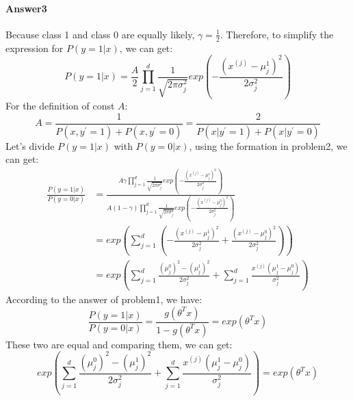 \documentclass[paper=a4, fontsize=11pt]{scrartcl} %
\numberwithin{equation}{section} %
\numberwithin{figure}{section} %
\numberwithin{table}{section} %
\begin{document}
\paragraph{\textbf{Answer3}}
Because class 1 and class 0 are equally likely, $\gamma=\frac{1}{2}$. Therefore, to simplify the expression for $P\left ( y=1|x \right )$, we can get:
\begin{equation*}
P\left ( y=1|x \right )=\frac{A}{2}\prod_{j=1}^{d}\frac{1}{\sqrt{2\pi \sigma _{j}^{2}}}exp\left ( -\frac{\left ( x^{\left ( j \right )}-\mu _{j}^{1} \right )^{2}}{2\sigma _{j}^{2}} \right )
\end{equation*}
For the definition of const $A$:
\begin{equation*}
A =\frac{1}{P\left ( x,y^{'}=1 \right ) +P\left ( x,y^{'}=0 \right )}=\frac{2}{P\left ( x|y^{'}=1 \right ) +P\left ( x|y^{'}=0 \right )}
\end{equation*}
Let's divide $P\left ( y=1|x \right )$ with $P\left ( y=0|x \right )$, using the formation in problem2, we can get:
\begin{align*}
\frac{P\left ( y=1|x \right )}{P\left ( y=0|x \right )}
&= \frac{A \gamma\prod_{j=1}^{d}\frac{1}{\sqrt{2\pi \sigma _{j}^{2}}}exp\left ( -\frac{\left ( x^{\left ( j \right )}-\mu _{j}^{1} \right )^{2}}{2\sigma _{j}^{2}} \right )}{A \left ( 1-\gamma \right )\prod_{j=1}^{d}\frac{1}{\sqrt{2\pi \sigma _{j}^{2}}}exp\left ( -\frac{\left ( x^{\left ( j \right )}-\mu _{j}^{0} \right )^{2}}{2\sigma _{j}^{2}} \right )}
\\&= exp\left ( \sum_{j=1}^{d} \left (  -\frac{\left ( x^{\left ( j \right )}-\mu _{j}^{1} \right )^{2}}{2\sigma _{j}^{2}} +\frac{\left ( x^{\left ( j \right )}-\mu _{j}^{0} \right )^{2}}{2\sigma _{j}^{2}} \right )\right )
\\&= exp\left ( \sum_{j=1}^{d}\frac{\left ( \mu _{j}^{0} \right )^{2}-\left ( \mu _{j}^{1} \right )^{2}}{2\sigma _{j}^{2}}+\sum_{j=1}^{d}\frac{x^{\left ( j \right )}\left ( \mu _{j}^{1}-\mu_{j}^{0} \right )}{\sigma _{j}^{2}} \right )
\end{align*}
According to the answer of problem1, we have:
\begin{equation*}
\frac{P\left ( y=1|x \right )}{P\left ( y=0|x \right )}=\frac{g\left ( \theta ^{T}x \right )}{1-g\left ( \theta ^{T}x \right )}=exp\left ( \theta ^{T}x \right )
\end{equation*}
These two are equal and comparing them, we can get:
\begin{equation*}
exp\left ( \sum_{j=1}^{d}\frac{\left ( \mu _{j}^{0} \right )^{2}-\left ( \mu _{j}^{1} \right )^{2}}{2\sigma _{j}^{2}}+\sum_{j=1}^{d}\frac{x^{\left ( j \right )}\left ( \mu _{j}^{1}-\mu_{j}^{0} \right )}{\sigma _{j}^{2}} \right )=exp\left ( \theta ^{T}x \right )
\end{equation*}
\end{document}
